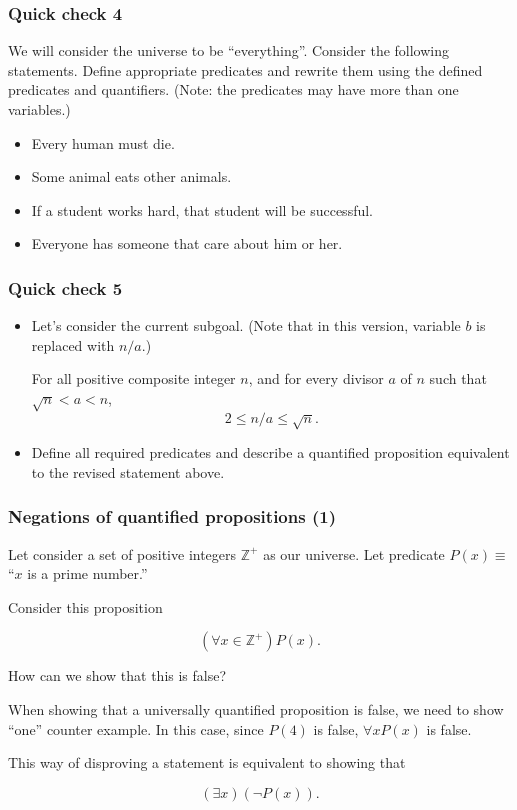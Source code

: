 \begin{frame}\frametitle{Quick check 4}
  We will consider the universe to be ``everything''.  Consider the
  following statements.  Define appropriate predicates and rewrite
  them using the defined predicates and quantifiers.  (Note: the
  predicates may have more than one variables.)
  \begin{itemize}
  \item Every human must die.
  \item Some animal eats other animals.
  \item If a student works hard, that student will be successful.
  \item Everyone has someone that care about him or her.
  \end{itemize}                  
\end{frame}

\begin{frame}\frametitle{Quick check 5}
  \begin{itemize}
  \item Let's consider the current subgoal.  (Note that in this
    version, variable $b$ is replaced with $n/a$.)
    
    \begin{tcolorbox}[title=Another revised statement]
      For all positive composite integer $n$, and for every divisor
      $a$ of $n$ such that $\sqrt{n} < a < n$,
      \[ 2\leq n/a \leq\sqrt{n}.\]
    \end{tcolorbox}

  \item Define all required predicates and describe a quantified
    proposition equivalent to the revised statement above.

    \vspace{1in}
    
  \end{itemize}
\end{frame}

\begin{frame}\frametitle{Negations of quantified propositions (1)}
  Let consider a set of positive integers $\mathbb Z^+$ as our
  universe.  Let predicate $P(x)\equiv$ ``$x$ is a prime number.''

  Consider this proposition

  \[(\forall x\in {\mathbb Z^+}) P(x).\]

  How can we show that this is false? \pause

  When showing that a universally quantified proposition is false, we
  need to show ``one'' counter example.  In this case, since $P(4)$ is
  false, $\forall x P(x)$ is false.  \pause

  This way of disproving a statement is equivalent to showing that

  \[(\exists x)(\neg P(x)).\]
\end{frame}

